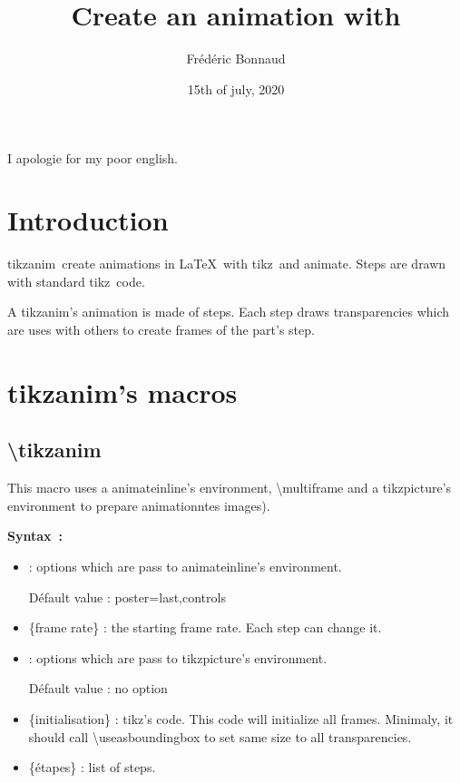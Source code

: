 \documentclass[a4paper,12pt]{article}
\author{Frédéric Bonnaud}%
\title{\TikzAnimate\\ Create an animation with \Tikz}
\date{15th of july, 2020}
\newcommand\Tikz{{\ttfamily tikz}}
\newcommand\TikzAnimate{{\ttfamily tikzanim}}
\newcommand\Animate{{\ttfamily animate}}
\begin{document}
\maketitle

\tableofcontents

\bigskip

I apologie for my poor english.

\section{Introduction}

\TikzAnimate\ create animations in \LaTeX\ with  \Tikz\ and \Animate. Steps are drawn with standard \Tikz\ code. 

A \TikzAnimate's animation is made of steps. Each step draws transparencies which are uses with others to create frames of the part's step.

\section{\TikzAnimate's macros}

\subsection{\ttfamily\textbackslash tikzanim}

	This macro uses a {\ttfamily animateinline}'s environment, {\ttfamily\textbackslash multiframe} and a {\ttfamily tikzpicture}'s environment to prepare animationntes images).
	
	\textbf{Syntax~:} 
	
	
	\begin{itemize}
		\item {} : options which are pass to {\ttfamily animateinline}'s environment.
		
		Défault value : {\ttfamily poster=last,controls}
		\item {\ttfamily \{frame rate\}} : the starting frame rate. Each step can change it.
		\item {} : options which are pass to {\ttfamily tikzpicture}'s environment.
		
		Défault value : no option
		\item {\ttfamily \{initialisation\}} : \Tikz's code. This code will initialize all frames. Minimaly, it should call {\ttfamily\textbackslash useasboundingbox} to
		set same size to all transparencies.
		\item {\ttfamily \{étapes\}} : list of steps. 
	\end{itemize}
	
\end{document}
